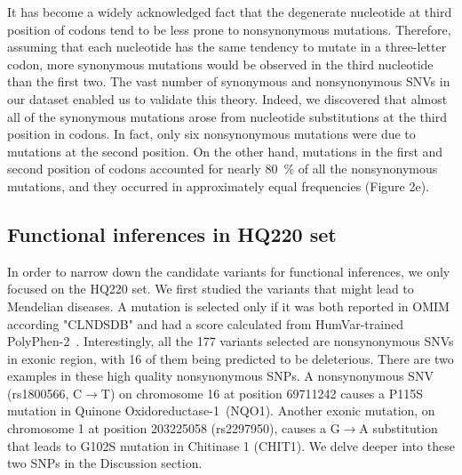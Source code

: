 \documentclass[a4paper, 12pt]{article}
\begin{document}
				It has become a widely acknowledged fact that the degenerate nucleotide at third position of codons tend to be less prone to nonsynonymous mutations. Therefore, assuming that each nucleotide has the same tendency to mutate in a three-letter codon, more synonymous mutations would be observed in the third nucleotide than the first two. The vast number of synonymous and nonsynonymous SNVs in our dataset enabled us to validate this theory. Indeed, we discovered that almost all of the synonymous mutations arose from nucleotide substitutions at the third position in codons. In fact, only six nonsynonymous mutations were due to mutations at the second position. On the other hand, mutations in the first and second position of codons accounted for nearly 80~\% of all the nonsynonymous mutations, and they occurred in approximately equal frequencies (Figure 2e).
		
			\subsection*{Functional inferences in HQ220 set}
				
				In order to narrow down the candidate variants for functional inferences, we only focused on the HQ220 set. We first studied the variants that might lead to Mendelian diseases. A mutation is selected only if it was both reported in OMIM according "CLNDSDB" and had a score calculated from HumVar-trained PolyPhen-2~\parencite{Adzhubei2010}. Interestingly, all the 177 variants selected are nonsynonymous SNVs in exonic region, with 16 of them being predicted to be deleterious. There are two examples in these high quality nonsynonymous SNPs. A nonsynonymous SNV (rs1800566, C$\rightarrow$T) on chromosome 16 at position 69711242 causes a P115S mutation in Quinone Oxidoreductase-1~(NQO1). Another exonic mutation, on chromosome 1 at position 203225058 (rs2297950), causes a G$\rightarrow$A substitution that leads to G102S mutation in Chitinase 1 (CHIT1). We delve deeper into these two SNPs in the Discussion section.
				
\end{document}
